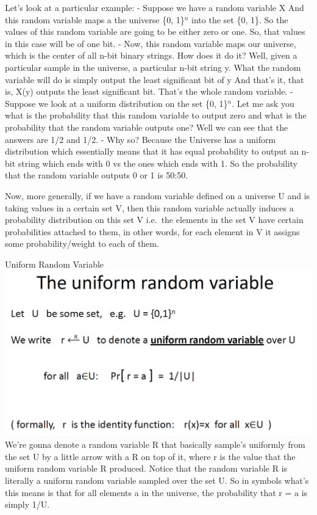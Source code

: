 \documentclass[11pt]{article}
\makeatletter
\def\maxwidth{\ifdim\Gin@nat@width>\linewidth\linewidth
    \else\Gin@nat@width\fi}
\let\Oldincludegraphics\includegraphics
\renewcommand{\includegraphics}[1]{\Oldincludegraphics[width=.8\maxwidth]{#1}}
\makeatother
\begin{document}
Let's look at a particular example: - Suppose we have a random variable
X And this random variable maps a the universe \{0, 1\}\(^n\) into the
set \{0, 1\}. So the values of this random variable are going to be
either zero or one. So, that values in this case will be of one bit. -
Now, this random variable maps our universe, which is the center of all
n-bit binary strings. How does it do it? Well, given a particular sample
in the universe, a particular n-bit string y. What the random variable
will do is simply output the least significant bit of y And that's it,
that is, X(y) outputs the least significant bit. That's the whole random
variable. - Suppose we look at a uniform distribution on the set \{0,
1\}\(^n\). Let me ask you what is the probability that this random
variable to output zero and what is the probability that the random
variable outputs one? Well we can see that the answers are 1/2 and 1/2.
- Why so? Because the Universe has a uniform distribution which
essentially means that it has equal probability to output an n-bit
string which ends with 0 vs the ones which ends with 1. So the
probability that the random variable outputs 0 or 1 is 50:50.

Now, more generally, if we have a random variable defined on a universe
U and is taking values in a certain set V, then this random variable
actually induces a probability distribution on this set V i.e.~the
elements in the set V have certain probabilities attached to them, in
other words, for each element in V it assigns some probability/weight to
each of them.

Uniform Random Variable \includegraphics{./Images/UniformRandVar.png}
We're gonna denote a random variable R that basically sample's uniformly
from the set U by a little arrow with a R on top of it, where r is the
value that the uniform random variable R produced. Notice that the
random variable R is literally a uniform random variable sampled over
the set U. So in symbols what's this means is that for all elements a in
the universe, the probability that r = a is simply
1/\textbar{}U\textbar{}.
\end{document}
